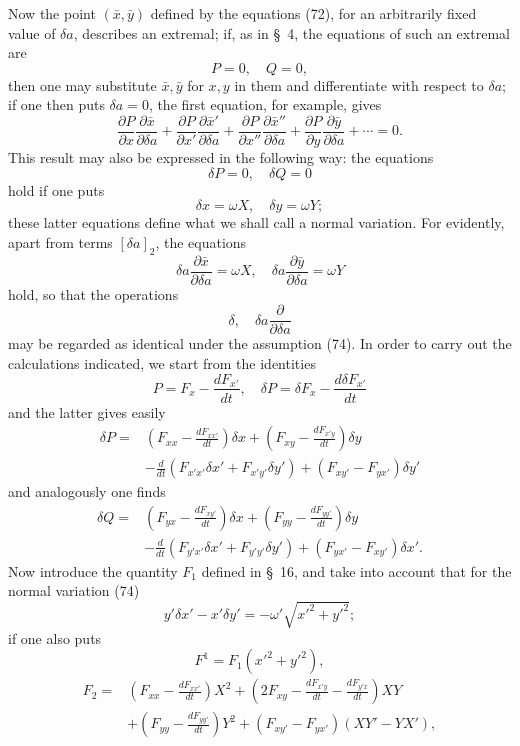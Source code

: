 \documentclass[11pt,a4paper,leqno]{article}
\begin{document}
Now the point $(\bar x,\bar y)$ defined by the equations (72), for an arbitrarily fixed value of $\delta a$, describes an extremal; if, as in \S~4, the equations of such an extremal are
\[
P=0,\quad Q=0,
\]
then one may substitute $\bar x,\bar y$ for $x,y$ in them and differentiate with respect to $\delta a$; if one then puts $\delta a=0$, the first equation, for example, gives
\[
\frac{\partial P}{\partial x}\frac{\partial\bar x}{\partial\delta a}
+\frac{\partial P}{\partial x'}\frac{\partial\bar x'}{\partial\delta a}
+\frac{\partial P}{\partial x''}\frac{\partial\bar x''}{\partial\delta a}
+\frac{\partial P}{\partial y}\frac{\partial\bar y}{\partial\delta a}+\cdots=0.
\]
This result may also be expressed in the following way: the equations
\[
\delta P=0,\quad \delta Q=0
\]
hold if one puts
\begin{equation}\tag{74}
\delta x=\omega X,
\quad
\delta y=\omega Y;
\end{equation}
these latter equations define what we shall call a normal variation. For evidently, apart from terms $[\delta a]_2$, the equations
\[
\delta a\frac{\partial\bar x}{\partial\delta a}=\omega X,
\quad
\delta a\frac{\partial\bar y}{\partial\delta a}=\omega Y
\]
hold, so that the operations
\[
\delta,
\quad \delta a\frac{\partial}{\partial\delta a}
\]
may be regarded as identical under the assumption (74). In order to carry out the calculations indicated, we start from the identities
\[
P=F_x-\frac{dF_{x'}}{dt},\quad
\delta P=\delta F_x-\frac{d\delta F_{x'}}{dt}
\]
and the latter gives easily
\[
\begin{aligned}
\delta P={}&\left(F_{xx}-\frac{dF_{xx'}}{dt}\right)\delta x
+\left(F_{xy}-\frac{dF_{x'y}}{dt}\right)\delta y\\
&-\frac{d}{dt}(F_{x'x'}\delta x'+F_{x'y'}\delta y')
+(F_{xy'}-F_{yx'})\delta y'
\end{aligned}
\]
and analogously one finds
\[
\begin{aligned}
\delta Q={}&\left(F_{yx}-\frac{dF_{xy'}}{dt}\right)\delta x
+\left(F_{yy}-\frac{dF_{yy'}}{dt}\right)\delta y\\
&-\frac{d}{dt}(F_{y'x'}\delta x'+F_{y'y'}\delta y')
+(F_{yx'}-F_{xy'})\delta x'.
\end{aligned}
\]
Now introduce the quantity $F_1$ defined in \S~16, and take into account that for the normal variation (74)
\[
y'\delta x'-x'\delta y'=-\omega'\sqrt{x'^2+y'^2};
\]
if one also puts
\[
F^1=F_1(x'^2+y'^2),
\]
\[
\begin{aligned}
F_2={}&\left(F_{xx}-\frac{dF_{xx'}}{dt}\right)X^2
+\left(2F_{xy}-\frac{dF_{x'y}}{dt}-\frac{dF_{y'x}}{dt}\right)XY\\
&+\left(F_{yy}-\frac{dF_{yy'}}{dt}\right)Y^2
+(F_{xy'}-F_{yx'})(XY'-YX'),
\end{aligned}
\]
\end{document}

